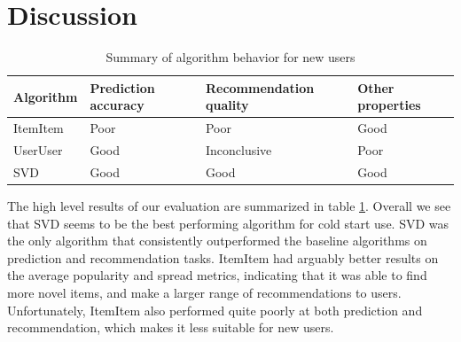 \documentclass[letterpaper]{sig-alternate}
\begin{document}
\section{Discussion}

    
  \begin{table}[ht!]
    \centering
    \begin{tabular}{|p{4.5em}|p{4.5em}|p{7.5em}|p{4.5em}|}
      \hline
      {\bf Algorithm} & {\bf Prediction accuracy} & {\bf Recommendation quality} & {\bf Other properties} \\\hline
      ItemItem        & Poor                      & Poor                         & Good                   \\\hline
      UserUser        & Good                      & Inconclusive                 & Poor                   \\\hline
      SVD             & Good                      & Good                         & Good                   \\\hline
    \end{tabular}
    \caption{Summary of algorithm behavior for new users}
    \label{tbl:results}
  \end{table}

  The high level results of our evaluation are summarized in table \ref{tbl:results}.
  Overall we see that SVD seems to be the best performing algorithm for cold start use.
  SVD was the only algorithm that consistently outperformed the baseline algorithms on prediction and recommendation tasks.
  ItemItem had arguably better results on the average popularity and spread metrics, indicating that it was able to find more novel items, and make a larger range of recommendations to users.
  Unfortunately, ItemItem also performed quite poorly at both prediction and recommendation, which makes it less suitable for new users.
\end{document}
